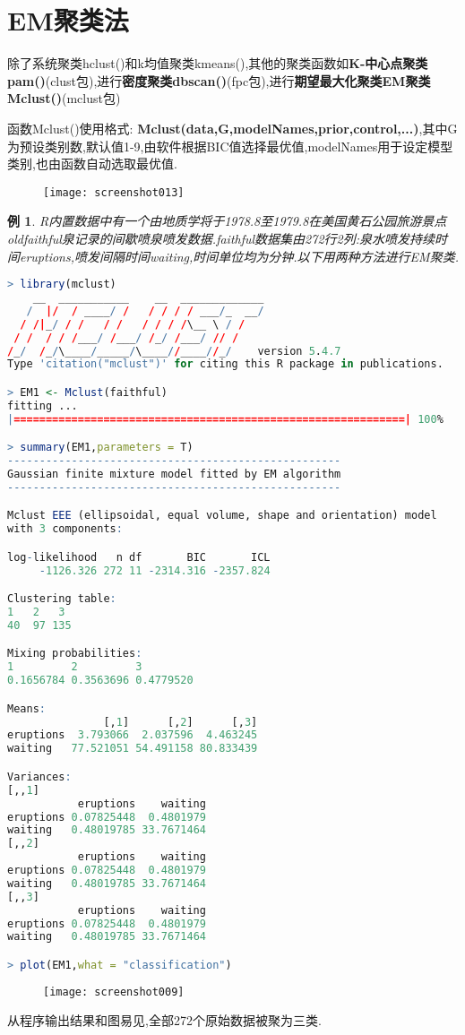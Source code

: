 \documentclass[11pt,a4paper,oneside]{book}
\newtheorem{e}{例}
\begin{document}
\section{EM聚类法}
除了系统聚类hclust()和k均值聚类kmeans(),其他的聚类函数如\textbf{K-中心点聚类pam()}(clust包),进行\textbf{密度聚类dbscan()}(fpc包),进行\textbf{期望最大化聚类EM聚类Mclust()}(mclust包)

函数Mclust()使用格式: \textbf{Mclust(data,G,modelNames,prior,control,...)},其中G为预设类别数,默认值1-9,由软件根据BIC值选择最优值,modelNames用于设定模型类别,也由函数自动选取最优值.
\begin{figure}[H]
	\centering
	\texttt{[image: screenshot013]}
\end{figure}

\begin{e}
R内置数据中有一个由地质学将于1978.8至1979.8在美国黄石公园旅游景点oldfaithful泉记录的间歇喷泉喷发数据.faithful数据集由272行2列:泉水喷发持续时间eruptions,喷发间隔时间waiting,时间单位均为分钟.以下用两种方法进行EM聚类.
\end{e}

\begin{lstlisting}[language=r]
> library(mclust)
    __  ___________    __  _____________
   /  |/  / ____/ /   / / / / ___/_  __/
  / /|_/ / /   / /   / / / /\__ \ / /   
 / /  / / /___/ /___/ /_/ /___/ // /    
/_/  /_/\____/_____/\____//____//_/    version 5.4.7
Type 'citation("mclust")' for citing this R package in publications.

> EM1 <- Mclust(faithful)
fitting ...
|=============================================================| 100%

> summary(EM1,parameters = T)
---------------------------------------------------- 
Gaussian finite mixture model fitted by EM algorithm 
---------------------------------------------------- 

Mclust EEE (ellipsoidal, equal volume, shape and orientation) model
with 3 components: 

log-likelihood   n df       BIC       ICL
     -1126.326 272 11 -2314.316 -2357.824

Clustering table:
1   2   3 
40  97 135 

Mixing probabilities:
1         2         3 
0.1656784 0.3563696 0.4779520 

Means:
               [,1]      [,2]      [,3]
eruptions  3.793066  2.037596  4.463245
waiting   77.521051 54.491158 80.833439

Variances:
[,,1]
           eruptions    waiting
eruptions 0.07825448  0.4801979
waiting   0.48019785 33.7671464
[,,2]
           eruptions    waiting
eruptions 0.07825448  0.4801979
waiting   0.48019785 33.7671464
[,,3]
           eruptions    waiting
eruptions 0.07825448  0.4801979
waiting   0.48019785 33.7671464

> plot(EM1,what = "classification")
\end{lstlisting}
\begin{figure}[H]
	\centering
	\texttt{[image: screenshot009]}
\end{figure}
从程序输出结果和图易见,全部272个原始数据被聚为三类.
\end{document}
